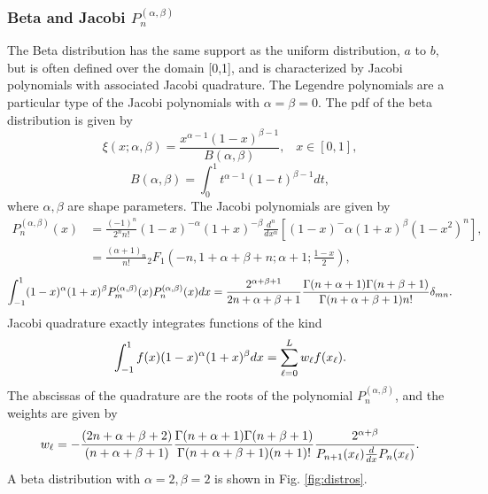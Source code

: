 \subsubsection{Beta and Jacobi $P_n^{(\alpha,\beta)}$}
The Beta distribution has the same support as the uniform distribution, $a$ to $b$, but is often defined over the domain [0,1], and is characterized by Jacobi polynomials with associated Jacobi quadrature.  The Legendre polynomials are a particular type of the Jacobi polynomials with $\alpha=\beta=0$.  The pdf of the beta distribution is given by
\begin{equation}
\xi(x;\alpha,\beta)=\frac{x^{\alpha-1}(1-x)^{\beta-1}}{B(\alpha,\beta)}, \hspace{10pt} x\in[0,1],
\end{equation}
\begin{equation}
B(\alpha,\beta)=\int_0^1 t^{\alpha-1}(1-t)^{\beta-1} dt,
\end{equation}
where $\alpha,\beta$ are shape parameters.  The Jacobi polynomials are given by
\begin{align}
P_n^{(\alpha,\beta)}(x)&=\frac{(-1)^n}{2^nn!}(1-x)^{-\alpha}(1+x)^{-\beta}\frac{d^n}{dx^n}
  \left[(1-x)^-\alpha(1+x)^\beta(1-x^2)^n \right],\\
  &=\frac{(\alpha+1)_n}{n!}{}_2F_1\left(-n,1+\alpha+\beta+n;\alpha+1;\frac{1-x}{2}\right),
\end{align}
\begin{equation}
\int_{-1}^1(1-x)^\alpha(1+x)^\beta P_m^{(\alpha,\beta)}(x)P_n^{(\alpha,\beta)}(x)dx=
    \frac{2^{\alpha+\beta+1}}{2n+\alpha+\beta+1}
    \frac{\Gamma(n+\alpha+1)\Gamma(n+\beta+1)}{\Gamma(n+\alpha+\beta+1)n!}\delta_{mn}.
\end{equation}
Jacobi quadrature exactly integrates functions of the kind
\begin{equation}
\int_{-1}^1 f(x) (1-x)^\alpha(1+x)^\beta dx = \sum_{\ell=0}^L w_\ell f(x_\ell).
\end{equation}
The abscissas of the quadrature are the roots of the polynomial $P_n^{(\alpha,\beta)}$, and the weights are given by
\begin{equation}
w_\ell=-\frac{(2n+\alpha+\beta+2)}{(n+\alpha+\beta+1)}
  \frac{\Gamma(n+\alpha+1)\Gamma(n+\beta+1)}{\Gamma(n+\alpha+\beta+1)(n+1)!}
  \frac{2^{\alpha+\beta}}{P_{n+1}(x_\ell)\frac{d }{d x}P_n(x_\ell)}.
\end{equation}
A beta distribution with $\alpha=2,\beta=2$ is shown in Fig. \ref{fig:distros}.

\newpage


